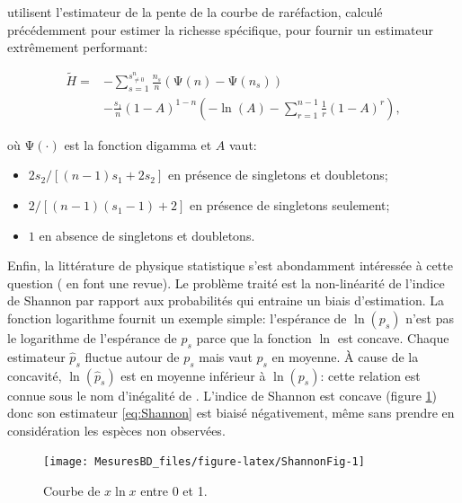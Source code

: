 \documentclass[
  11pt,
  french,
  a4paper,
  extrafontsizes,onecolumn,openright
  ]{memoir}
\providecommand{\tightlist}{%
  \setlength{\itemsep}{0pt}\setlength{\parskip}{0pt}}
\newlength{\rf}
\begin{document}
\textcite{Chao2013} utilisent l'estimateur de la pente de la courbe de raréfaction, calculé précédemment \autocite{Chao2012b} pour estimer la richesse spécifique, pour fournir un estimateur extrêmement performant:

\begin{align}
  \label{eq:Chao2013}
  \tilde{H}
  = &-\sum_{s=1}^{s^{n}_{\ne 0}}
    {\frac{n_s}{n}\left(\mathrm{\Psi}\left(n\right) - \mathrm{\Psi}\left(n_s\right)\right)} \\
  &-\frac{s_{1}}{n} {\left(1-A\right)}^{1-n} \left(-{\ln\left( A \right)}-\sum^{n-1}_{r=1}{\frac{1}{r}{\left( 1-A \right)}^r}\right),
\end{align}

où \(\mathrm{\Psi}\left(\cdot\right)\) est la fonction digamma et \(A\) vaut:

\begin{itemize}
\tightlist
\item
  \(2s_{2}/{\left[\left(n-1\right) s_{1} +2s_{2}\right]}\) en présence de singletons et doubletons;
\item
  \(2/{\left[\left(n-1\right)\left(s_{1} -1\right)+2\right]}\) en présence de singletons seulement;
\item
  \(1\) en absence de singletons et doubletons.
\end{itemize}

Enfin, la littérature de physique statistique s'est abondamment intéressée à cette question (\textcite{Bonachela2008} en font une revue).
Le problème traité est la non-linéarité de l'indice de Shannon par rapport aux probabilités qui entraine un biais d'estimation.
La fonction logarithme fournit un exemple simple: l'espérance de \(\ln(p_s)\) n'est pas le logarithme de l'espérance de \(p_s\) parce que la fonction \(\ln\) est concave.
Chaque estimateur \({\hat{p}}_s\) fluctue autour de \(p_s\) mais vaut \(p_s\) en moyenne.
À cause de la concavité, \(\ln({\hat{p}}_s)\) est en moyenne inférieur à \(\ln(p_s)\): cette relation est connue sous le nom d'inégalité de \textcite{Jensen1906}.
L'indice de Shannon est concave (figure \ref{fig:ShannonFig}) donc son estimateur \eqref{eq:Shannon} est biaisé négativement, même sans prendre en considération les espèces non observées.



\scriptsize

\begin{figure}

{\centering \texttt{[image: MesuresBD\_files/figure-latex/ShannonFig-1]} 

}

\caption{Courbe de \(x\ln x\) entre 0 et 1.}\label{fig:ShannonFig}
\end{figure}
\end{document}
